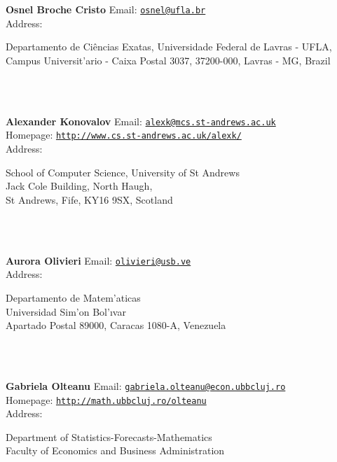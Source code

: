 \documentclass[a4paper,11pt]{report}
\begin{document}
\begin{titlepage}
\mbox{}\\
{\mbox{}\\
\small \noindent \textbf{Osnel Broche Cristo   }  Email: \href{mailto://osnel@ufla.br} {\texttt{osnel@ufla.br}}\\
  Address: \begin{minipage}[t]{8cm}\noindent
 Departamento de Ci{\^e}ncias Exatas, Universidade Federal de Lavras - UFLA,
Campus Universit{\a'a}rio - Caixa Postal 3037, 37200-000, Lavras - MG, Brazil \end{minipage}
}\\
{\mbox{}\\
\small \noindent \textbf{Alexander Konovalov    }  Email: \href{mailto://alexk@mcs.st-andrews.ac.uk} {\texttt{alexk@mcs.st-andrews.ac.uk}}\\
  Homepage: \href{http://www.cs.st-andrews.ac.uk/~alexk/} {\texttt{http://www.cs.st-andrews.ac.uk/\texttt{}alexk/}}\\
  Address: \begin{minipage}[t]{8cm}\noindent
 School of Computer Science, University of St Andrews\\
 Jack Cole Building, North Haugh,\\
 St Andrews, Fife, KY16 9SX, Scotland \end{minipage}
}\\
{\mbox{}\\
\small \noindent \textbf{Aurora Olivieri   }  Email: \href{mailto://olivieri@usb.ve} {\texttt{olivieri@usb.ve}}\\
  Address: \begin{minipage}[t]{8cm}\noindent
 Departamento de Matem{\a'a}ticas\\
 Universidad Sim{\a'o}n Bol{\a'\i}var\\
 Apartado Postal 89000, Caracas 1080-A, Venezuela \end{minipage}
}\\
{\mbox{}\\
\small \noindent \textbf{Gabriela Olteanu    }  Email: \href{mailto://gabriela.olteanu@econ.ubbcluj.ro} {\texttt{gabriela.olteanu@econ.ubbcluj.ro}}\\
  Homepage: \href{http://math.ubbcluj.ro/~olteanu} {\texttt{http://math.ubbcluj.ro/\texttt{}olteanu}}\\
  Address: \begin{minipage}[t]{8cm}\noindent
 Department of Statistics-Forecasts-Mathematics\\
 Faculty of Economics and Business Administration\\

\end{minipage}}
\end{titlepage}
\end{document}
